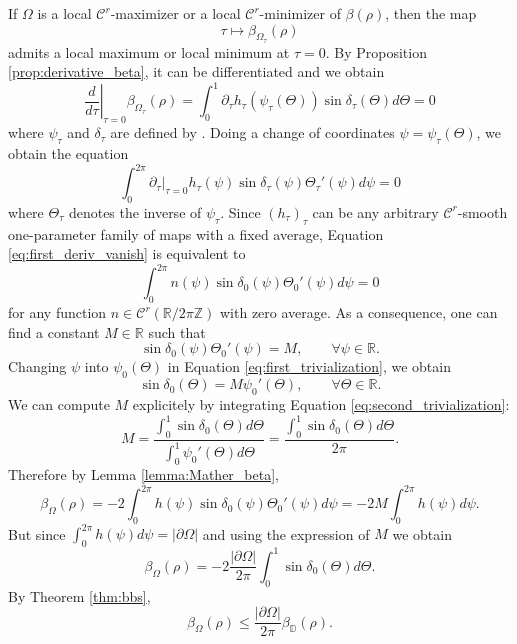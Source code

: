 \documentclass[a4paper]{article}
\theoremstyle{definition}
\def\D{\mathbb{D}}
\def\R{\mathbb{R}}
\def\Z{\mathbb{Z}}
\begin{document}
If $\Omega$ is a local $\mathscr C^r$-maximizer or a local $\mathscr C^r$-minimizer of $\beta(\rho)$, then the map 
\[
\tau\mapsto\beta_{\Omega_{\tau}}(\rho)
\]
admits a local maximum or local minimum at $\tau=0$. By Proposition \ref{prop:derivative_beta}, it can be differentiated and we obtain
\[
\left.\frac{d}{d\tau}\right|_{\tau=0}\beta_{\Omega_{\tau}}(\rho) = \int_0^1\partial_{\tau}h_{\tau}(\psi_{\tau}(\Theta))\sin\delta_{\tau}(\Theta)d\Theta = 0
\]
where $\psi_{\tau}$ and $\delta_{\tau}$ are defined by .
Doing a change of coordinates $\psi=\psi_{\tau}(\Theta)$, we obtain the equation 
\begin{equation}
    \label{eq:first_deriv_vanish}
    \int_0^{2\pi}\left.\partial_{\tau}\right|_{\tau=0}h_{\tau}(\psi)\sin\delta_{\tau}(\psi)\Theta_{\tau}'(\psi)d\psi = 0
\end{equation}
where $\Theta_{\tau}$ denotes the inverse of $\psi_{\tau}$.
Since $(h_{\tau})_{\tau}$ can be any arbitrary $\mathscr C^r$-smooth one-parameter family of maps with a fixed average, Equation \eqref{eq:first_deriv_vanish} is equivalent to 
\[
    \int_0^{2\pi}n(\psi)\sin\delta_{0}(\psi)\Theta_{0}'(\psi)d\psi = 0
\]
for any function $n\in\mathscr C^r(\R/2\pi\Z)$ with zero average. As a consequence, one can find a constant $M\in\R$ such that
\begin{equation}
    \label{eq:first_trivialization}
    \sin\delta_{0}(\psi)\Theta_{0}'(\psi) = M,
    \qquad\forall\psi\in\R.
\end{equation}
Changing $\psi$ into $\psi_0(\Theta)$ in Equation \eqref{eq:first_trivialization}, we obtain
\begin{equation}
    \label{eq:second_trivialization}
    \sin\delta_{0}(\Theta)=M\psi_{0}'(\Theta),
    \qquad\forall\Theta\in\R.
\end{equation}
We can compute $M$ explicitely by integrating Equation \eqref{eq:second_trivialization}:
\[
M = \frac{\int_0^1\sin\delta_0(\Theta)d\Theta}{\int_0^1\psi_0'(\Theta)d\Theta} = \frac{\int_0^1\sin\delta_0(\Theta)d\Theta}{2\pi}.
\]
Therefore by Lemma \ref{lemma:Mather_beta}, 
\[
\beta_{\Omega}(\rho) = -2\int_0^{2\pi} h(\psi)\sin\delta_0(\psi)\Theta_0'(\psi)d\psi = -2M\int_0^{2\pi}h(\psi)d\psi.
\]
But since $\int_0^{2\pi}h(\psi)d\psi=|\partial\Omega|$ and using the expression of $M$ we obtain
\begin{equation}
\label{eq:nice_beta}
\beta_{\Omega}(\rho) = -2\frac{|\partial\Omega|}{2\pi}\int_0^1\sin\delta_0(\Theta)d\Theta.
\end{equation}
By Theorem \ref{thm:bbs}, 
\[
\beta_{\Omega}(\rho) \leq \frac{|\partial\Omega|}{2\pi}\beta_{\D}(\rho).
\]
\end{document}
